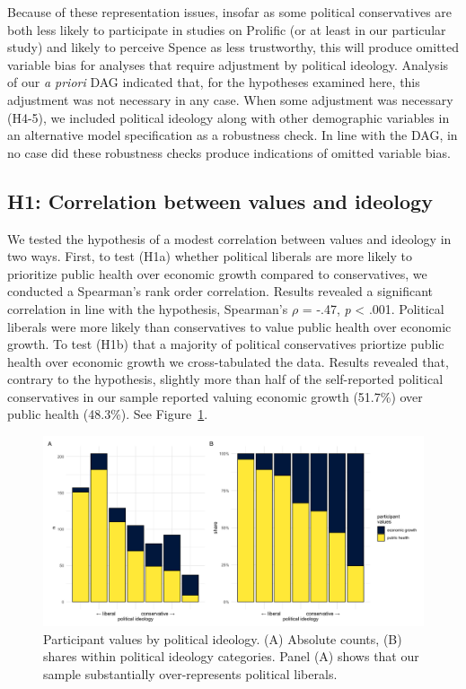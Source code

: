\documentclass[
  letterpaper,
  DIV=11,
  numbers=noendperiod]{scrartcl}
\begin{document}
Because of these representation issues, insofar as some political
conservatives are both less likely to participate in studies on Prolific
(or at least in our particular study) and likely to perceive Spence as
less trustworthy, this will produce omitted variable bias for analyses
that require adjustment by political ideology. Analysis of our \emph{a
priori} DAG indicated that, for the hypotheses examined here, this
adjustment was not necessary in any case. When some adjustment was
necessary (H4-5), we included political ideology along with other
demographic variables in an alternative model specification as a
robustness check. In line with the DAG, in no case did these robustness
checks produce indications of omitted variable bias.

\hypertarget{h1-correlation-between-values-and-ideology}{%
\subsection{H1: Correlation between values and
ideology}\label{h1-correlation-between-values-and-ideology}}

We tested the hypothesis of a modest correlation between values and
ideology in two ways. First, to test (H1a) whether political liberals
are more likely to prioritize public health over economic growth
compared to conservatives, we conducted a Spearman's rank order
correlation. Results revealed a significant correlation in line with the
hypothesis, Spearman's \(\rho\) = -.47, \emph{p} \textless{} .001.
Political liberals were more likely than conservatives to value public
health over economic growth. To test (H1b) that a majority of political
conservatives priortize public health over economic growth we
cross-tabulated the data. Results revealed that, contrary to the
hypothesis, slightly more than half of the self-reported political
conservatives in our sample reported valuing economic growth (51.7\%)
over public health (48.3\%). See Figure~\ref{fig-part-values}.

\begin{figure}

{\centering \includegraphics{fig2_part_values.png}

}

\caption{\label{fig-part-values}Participant values by political
ideology. (A) Absolute counts, (B) shares within political ideology
categories. Panel (A) shows that our sample substantially
over-represents political liberals.}

\end{figure}
\end{document}
